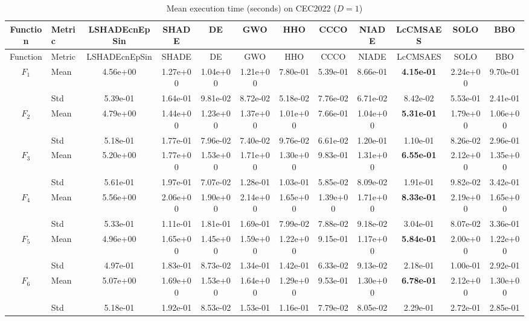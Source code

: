 \begin{center}
\small
\renewcommand{\arraystretch}{1.25}
\begin{longtable}{clcccccccccc}
\caption{Mean execution time (seconds) on CEC2022 ($D=1$) }
\label{tab:time_CEC2022_1} \\
\toprule
Function & Metric & LSHADEcnEpSin & SHADE & DE & GWO & HHO & CCCO & NIADE & LcCMSAES & SOLO & BBO \\
\midrule
\endfirsthead
\toprule
Function & Metric & LSHADEcnEpSin & SHADE & DE & GWO & HHO & CCCO & NIADE & LcCMSAES & SOLO & BBO \\
\midrule
\endhead
$F_{1}$ & Mean & 4.56e+00 & 1.27e+00 & 1.04e+00 & 1.21e+00 & 7.80e-01 & 5.39e-01 & 8.66e-01 & \textbf{4.15e-01} & 2.24e+00 & 9.70e-01 \\
 & Std & 5.39e-01 & 1.64e-01 & 9.81e-02 & 8.72e-02 & 5.18e-02 & 7.76e-02 & 6.71e-02 & 8.42e-02 & 5.53e-01 & 2.41e-01 \\
\midrule
$F_{2}$ & Mean & 4.79e+00 & 1.44e+00 & 1.23e+00 & 1.37e+00 & 1.01e+00 & 7.66e-01 & 1.04e+00 & \textbf{5.31e-01} & 1.79e+00 & 1.06e+00 \\
 & Std & 5.18e-01 & 1.77e-01 & 7.96e-02 & 7.40e-02 & 9.76e-02 & 6.61e-02 & 1.20e-01 & 1.10e-01 & 8.26e-02 & 2.96e-01 \\
\midrule
$F_{3}$ & Mean & 5.20e+00 & 1.77e+00 & 1.53e+00 & 1.71e+00 & 1.30e+00 & 9.83e-01 & 1.31e+00 & \textbf{6.55e-01} & 2.12e+00 & 1.35e+00 \\
 & Std & 5.61e-01 & 1.97e-01 & 7.07e-02 & 1.28e-01 & 1.03e-01 & 5.85e-02 & 8.09e-02 & 1.91e-01 & 9.82e-02 & 3.42e-01 \\
\midrule
$F_{4}$ & Mean & 5.56e+00 & 2.06e+00 & 1.90e+00 & 2.14e+00 & 1.65e+00 & 1.39e+00 & 1.71e+00 & \textbf{8.33e-01} & 2.19e+00 & 1.65e+00 \\
 & Std & 5.33e-01 & 1.11e-01 & 1.81e-01 & 1.69e-01 & 7.99e-02 & 7.88e-02 & 9.18e-02 & 3.04e-01 & 8.07e-02 & 3.36e-01 \\
\midrule
$F_{5}$ & Mean & 4.96e+00 & 1.65e+00 & 1.45e+00 & 1.59e+00 & 1.22e+00 & 9.15e-01 & 1.17e+00 & \textbf{5.84e-01} & 2.00e+00 & 1.22e+00 \\
 & Std & 4.97e-01 & 1.83e-01 & 8.73e-02 & 1.34e-01 & 1.42e-01 & 6.33e-02 & 9.13e-02 & 2.18e-01 & 1.00e-01 & 2.92e-01 \\
\midrule
$F_{6}$ & Mean & 5.07e+00 & 1.69e+00 & 1.53e+00 & 1.64e+00 & 1.29e+00 & 9.53e-01 & 1.30e+00 & \textbf{6.78e-01} & 2.12e+00 & 1.30e+00 \\
 & Std & 5.18e-01 & 1.92e-01 & 8.53e-02 & 1.53e-01 & 1.16e-01 & 7.79e-02 & 8.05e-02 & 2.29e-01 & 2.72e-01 & 2.85e-01 \\

\end{longtable}
\end{center}
